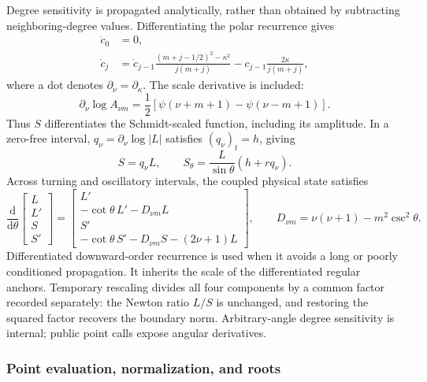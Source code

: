 ﻿\documentclass[11pt,a4paper]{article}
\newcommand{\dd}{\mathrm{d}}
\begin{document}
Degree sensitivity is propagated analytically, rather than obtained by subtracting neighboring-degree values. Differentiating the polar recurrence gives
\begin{align}
 \dot c_0&=0,\\
 \dot c_j&=\dot c_{j-1}
 \frac{(m+j-1/2)^2-\kappa^2}{j(m+j)}
 -c_{j-1}\frac{2\kappa}{j(m+j)},
 \label{eq:legendre_coefficient_sensitivity}
\end{align}
where a dot denotes $\partial_\nu=\partial_\kappa$. The scale derivative is included:
\begin{equation}
 \partial_\nu\log A_{\nu m}
 =\frac12\left[\psi(\nu+m+1)-\psi(\nu-m+1)\right].
 \label{eq:legendre_scale_sensitivity}
\end{equation}
Thus $S$ differentiates the Schmidt-scaled function, including its amplitude. In a zero-free interval, $q_\nu=\partial_\nu\log|L|$ satisfies $(q_\nu)_t=h$, giving
\begin{equation}
 S=q_\nu L,\qquad
 S_\theta=\frac{L}{\sin\theta}(h+r q_\nu).
 \label{eq:legendre_sensitivity_riccati_recovery}
\end{equation}
Across turning and oscillatory intervals, the coupled physical state satisfies
\begin{equation}
 \frac{\dd}{\dd\theta}
 \begin{bmatrix}L\\L'\\S\\S'\end{bmatrix}
 =
 \begin{bmatrix}
 L'\\-\cot\theta\,L'-D_{\nu m}L\\S'\\-\cot\theta\,S'-D_{\nu m}S-(2\nu+1)L
 \end{bmatrix},\qquad
 D_{\nu m}=\nu(\nu+1)-m^2\csc^2\theta.
 \label{eq:legendre_four_state}
\end{equation}
Differentiated downward-order recurrence is used when it avoids a long or poorly conditioned propagation. It inherits the scale of the differentiated regular anchors. Temporary rescaling divides all four components by a common factor recorded separately: the Newton ratio $L/S$ is unchanged, and restoring the squared factor recovers the boundary norm. Arbitrary-angle degree sensitivity is internal; public point calls expose angular derivatives.

\subsubsection{Point evaluation, normalization, and roots}
\end{document}
